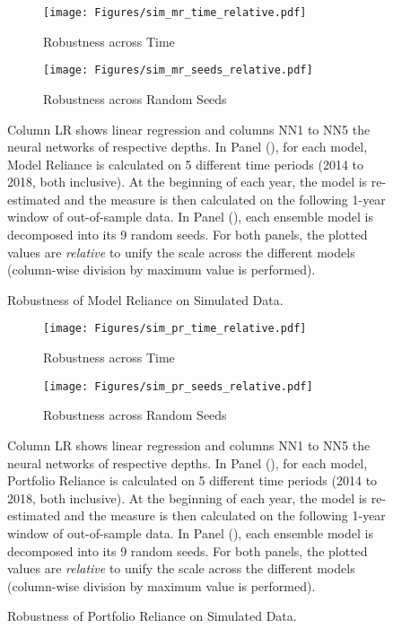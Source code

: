 \begin{figure}	
	\centering		
	\begin{subfigure}[t]{\textwidth}
		\texttt{[image: Figures/sim\_mr\_time\_relative.pdf]}
		\caption{Robustness across Time}
		\label{fig:sim_mr_time_relative}
	\end{subfigure}
	
	\begin{subfigure}[t]{\textwidth}
		\centering
		\texttt{[image: Figures/sim\_mr\_seeds\_relative.pdf]}
		\caption{Robustness across Random Seeds}
		\label{fig:sim_mr_seeds_relative}
	\end{subfigure}
	\caption{Robustness of Model Reliance on Simulated Data.}
	\medskip
	\small
	Column LR shows linear regression and columns NN1 to NN5 the neural networks of respective depths. In Panel (), for each model, Model Reliance is calculated on 5 different time periods (2014 to 2018, both inclusive). At the beginning of each year, the model is re-estimated and the measure is then calculated on the following 1-year window of out-of-sample data. In Panel (), each ensemble model is decomposed into its 9 random seeds. For both panels, the plotted values are \textit{relative} to unify the scale across the different models (column-wise division by maximum value is performed).
	\label{fig:sim_mr_robustness}
\end{figure}

\begin{figure}	
	\centering		
	\begin{subfigure}[t]{\textwidth}
		\texttt{[image: Figures/sim\_pr\_time\_relative.pdf]}
		\caption{Robustness across Time}
		\label{fig:sim_pr_time_relative}
	\end{subfigure}
	
	\begin{subfigure}[t]{\textwidth}
		\centering
		\texttt{[image: Figures/sim\_pr\_seeds\_relative.pdf]}
		\caption{Robustness across Random Seeds}
		\label{fig:sim_pr_seeds_relative}
	\end{subfigure}
	\caption{Robustness of Portfolio Reliance on Simulated Data.}
	\medskip
	\small
	Column LR shows linear regression and columns NN1 to NN5 the neural networks of respective depths. In Panel (), for each model, Portfolio Reliance is calculated on 5 different time periods (2014 to 2018, both inclusive). At the beginning of each year, the model is re-estimated and the measure is then calculated on the following 1-year window of out-of-sample data. In Panel (), each ensemble model is decomposed into its 9 random seeds. For both panels, the plotted values are \textit{relative} to unify the scale across the different models (column-wise division by maximum value is performed).
	\label{fig:sim_pr_robustness}
\end{figure}